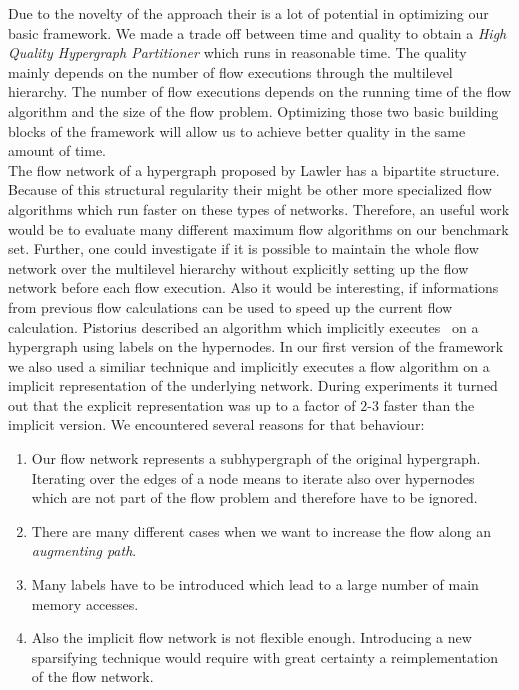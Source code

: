 Due to the novelty of the approach their is a lot of potential in optimizing our basic 
framework. We made a trade off between time and quality to obtain a \emph{High Quality 
Hypergraph Partitioner} which runs in reasonable time. The quality mainly depends
on the number of flow executions through the multilevel hierarchy. The number of flow
executions depends on the running time of the flow algorithm and the size of the flow
problem. Optimizing those two basic building blocks of the framework will allow us to
achieve better quality in the same amount of time.\\
The flow network of a hypergraph proposed by Lawler \cite{lawler1973} has a bipartite 
structure. Because of this structural regularity their might be other more specialized
flow algorithms which run faster on these types of networks. Therefore, an useful work 
would be to evaluate many different maximum flow algorithms on our benchmark set. Further,
one could investigate if it is possible to maintain the whole flow network over the
multilevel hierarchy without explicitly setting up the flow network before each flow
execution. Also it would be interesting, if informations from previous flow calculations can 
be used to speed up the current flow calculation. Pistorius \cite{pistorius2003} described
an algorithm which implicitly executes \EdmondKarp~on a hypergraph using
labels on the hypernodes. In our first version of the framework we also used a similiar 
technique and implicitly executes a flow algorithm on a implicit representation of 
the underlying network. During experiments it turned out that the explicit representation
was up to a factor of $2$-$3$ faster than the implicit version. We encountered several reasons
for that behaviour:
\begin{enumerate}
\item Our flow network represents a subhypergraph of the original hypergraph. Iterating 
      over the edges of a node means to iterate also over hypernodes which are not part of 
      the flow problem and therefore have to be ignored.
\item There are many different cases when we want to increase the flow along an 
      \emph{augmenting path}.
\item Many labels have to be introduced which lead to a large number of 
      main memory accesses.
\item Also the implicit flow network is not flexible enough. Introducing a new sparsifying
      technique would require with great certainty a reimplementation of the flow network.
\end{enumerate}
